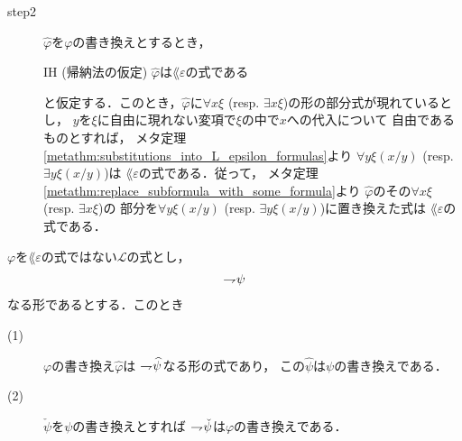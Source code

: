 \begin{metaprf}
\begin{description}
			\item[step2] $\widehat{\varphi}$を$\varphi$の書き換えとするとき，
				\begin{itembox}[l]{IH (帰納法の仮定)}
					$\widehat{\varphi}$は$\lang{\varepsilon}$の式である
				\end{itembox}
				と仮定する．このとき，$\widehat{\varphi}$に$\forall x \xi$ 
				(resp. $\exists x \xi$)の形の部分式が現れているとし，
				$y$を$\xi$に自由に現れない変項で$\xi$の中で$x$への代入について
				自由であるものとすれば，
				メタ定理\ref{metathm:substitutions_into_L_epsilon_formulas}より
				$\forall y \xi(x/y)$ (resp. $\exists y \xi(x/y)$)は
				$\lang{\varepsilon}$の式である．従って，
				メタ定理\ref{metathm:replace_subformula_with_some_formula}より
				$\widehat{\varphi}$のその$\forall x \xi$ (resp. $\exists x \xi$)の
				部分を$\forall y \xi(x/y)$ (resp. $\exists y \xi(x/y)$)に置き換えた式は
				$\lang{\varepsilon}$の式である．
				\QED
		\end{description}
	\end{metaprf}
	
	\begin{screen}
		\begin{metathm}[部分式の書き換えとの関係1]
		\label{metathm:relation_to_subformula_rewriting}
		\label{metathm:relation_to_subformula_rewriting_1}
			$\varphi$を$\lang{\varepsilon}$の式ではない$\mathcal{L}$の式とし，
			\begin{align}
				\rightharpoondown\hspace{-0.25em} \psi
			\end{align}
			なる形であるとする．このとき
			\begin{description}
				\item[(1)] $\varphi$の書き換え$\widehat{\varphi}$は
					$\rightharpoondown\hspace{-0.25em} \widehat{\psi}$なる形の式であり，
					この$\widehat{\psi}$は$\psi$の書き換えである．
					
				\item[(2)] $\check{\psi}$を$\psi$の書き換えとすれば
					$\rightharpoondown\hspace{-0.25em} \check{\psi}$は$\varphi$の書き換えである．
			\end{description}
		\end{metathm}
	\end{screen}
	
